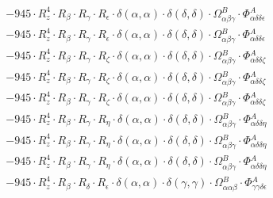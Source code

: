 \documentclass{article}
\begin{document}
\begin{subequations}
\begin{gather}
\begin{array}{c}
 \\[0.2em] 		 - 945 \cdot R_{z}^{4} \cdot R_{\beta{}} \cdot R_{\gamma{}} \cdot R_{\epsilon{}} \cdot \delta{}\left(\alpha{}, \alpha{}\right) \cdot \delta{}\left(\delta{}, \delta{}\right) \cdot \Omega{}^{B}_{\alpha{}\beta{}\gamma{}} \cdot \Phi{}^{A}_{\alpha{}\delta{}\delta{}\epsilon{}} 
 \\[0.2em] 		 - 945 \cdot R_{z}^{4} \cdot R_{\beta{}} \cdot R_{\gamma{}} \cdot R_{\epsilon{}} \cdot \delta{}\left(\alpha{}, \alpha{}\right) \cdot \delta{}\left(\delta{}, \delta{}\right) \cdot \Omega{}^{B}_{\alpha{}\beta{}\gamma{}} \cdot \Phi{}^{A}_{\alpha{}\delta{}\delta{}\epsilon{}} 
 \\[0.2em] 		 - 945 \cdot R_{z}^{4} \cdot R_{\beta{}} \cdot R_{\gamma{}} \cdot R_{\zeta{}} \cdot \delta{}\left(\alpha{}, \alpha{}\right) \cdot \delta{}\left(\delta{}, \delta{}\right) \cdot \Omega{}^{B}_{\alpha{}\beta{}\gamma{}} \cdot \Phi{}^{A}_{\alpha{}\delta{}\delta{}\zeta{}} 
 \\[0.2em] 		 - 945 \cdot R_{z}^{4} \cdot R_{\beta{}} \cdot R_{\gamma{}} \cdot R_{\zeta{}} \cdot \delta{}\left(\alpha{}, \alpha{}\right) \cdot \delta{}\left(\delta{}, \delta{}\right) \cdot \Omega{}^{B}_{\alpha{}\beta{}\gamma{}} \cdot \Phi{}^{A}_{\alpha{}\delta{}\delta{}\zeta{}} 
 \\[0.2em] 		 - 945 \cdot R_{z}^{4} \cdot R_{\beta{}} \cdot R_{\gamma{}} \cdot R_{\zeta{}} \cdot \delta{}\left(\alpha{}, \alpha{}\right) \cdot \delta{}\left(\delta{}, \delta{}\right) \cdot \Omega{}^{B}_{\alpha{}\beta{}\gamma{}} \cdot \Phi{}^{A}_{\alpha{}\delta{}\delta{}\zeta{}} 
 \\[0.2em] 		 - 945 \cdot R_{z}^{4} \cdot R_{\beta{}} \cdot R_{\gamma{}} \cdot R_{\eta{}} \cdot \delta{}\left(\alpha{}, \alpha{}\right) \cdot \delta{}\left(\delta{}, \delta{}\right) \cdot \Omega{}^{B}_{\alpha{}\beta{}\gamma{}} \cdot \Phi{}^{A}_{\alpha{}\delta{}\delta{}\eta{}} 
 \\[0.2em] 		 - 945 \cdot R_{z}^{4} \cdot R_{\beta{}} \cdot R_{\gamma{}} \cdot R_{\eta{}} \cdot \delta{}\left(\alpha{}, \alpha{}\right) \cdot \delta{}\left(\delta{}, \delta{}\right) \cdot \Omega{}^{B}_{\alpha{}\beta{}\gamma{}} \cdot \Phi{}^{A}_{\alpha{}\delta{}\delta{}\eta{}} 
 \\[0.2em] 		 - 945 \cdot R_{z}^{4} \cdot R_{\beta{}} \cdot R_{\gamma{}} \cdot R_{\eta{}} \cdot \delta{}\left(\alpha{}, \alpha{}\right) \cdot \delta{}\left(\delta{}, \delta{}\right) \cdot \Omega{}^{B}_{\alpha{}\beta{}\gamma{}} \cdot \Phi{}^{A}_{\alpha{}\delta{}\delta{}\eta{}} 
 \\[0.2em] 		 - 945 \cdot R_{z}^{4} \cdot R_{\beta{}} \cdot R_{\delta{}} \cdot R_{\epsilon{}} \cdot \delta{}\left(\alpha{}, \alpha{}\right) \cdot \delta{}\left(\gamma{}, \gamma{}\right) \cdot \Omega{}^{B}_{\alpha{}\alpha{}\beta{}} \cdot \Phi{}^{A}_{\gamma{}\gamma{}\delta{}\epsilon{}} 

\end{array}
\end{gather}
\end{subequations}
\end{document}
